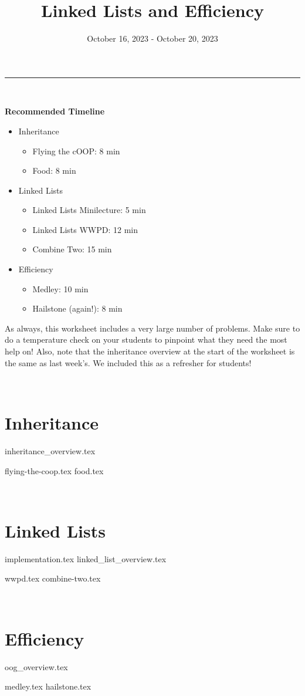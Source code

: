 \documentclass{exam}
\title{Linked Lists and Efficiency}
\date{October 16, 2023 - October 20, 2023}
\begin{document}
\maketitle
\rule{\textwidth}{0.15em}
​
\begin{meta}
    \textbf{Recommended Timeline}
    \begin{itemize}
        \item Inheritance
        \begin{itemize}
            \item Flying the cOOP: 8 min
            \item Food: 8 min
        \end{itemize}
        \item Linked Lists
        \begin{itemize}
            \item Linked Lists Minilecture: 5 min
            \item Linked Lists WWPD: 12 min
            \item Combine Two: 15 min
        \end{itemize}
        \item Efficiency
        \begin{itemize}
            \item Medley: 10 min
            \item Hailstone (again!): 8 min
        \end{itemize}
    \end{itemize}
    As always, this worksheet includes a very large number of problems. Make sure to do a temperature check on your students to pinpoint what they need the most help on!
    \newline Also, note that the inheritance overview at the start of the worksheet is the same as last week's. We included this as a refresher for students!
\end{meta}
​
\section{Inheritance}
{inheritance_overview.tex}
\begin{questions}
    {flying-the-coop.tex}
    {food.tex}
    \newpage
\end{questions}
​
\section{Linked Lists}
    {implementation.tex}
    {linked_list_overview.tex}
\begin{questions}
    {wwpd.tex}
    {combine-two.tex}
\end{questions}
​
\section{Efficiency}
{oog_overview.tex}
\begin{questions}
    \newpage
    {medley.tex}
    \newpage
    {hailstone.tex}
\end{questions}
​
\end{document}
